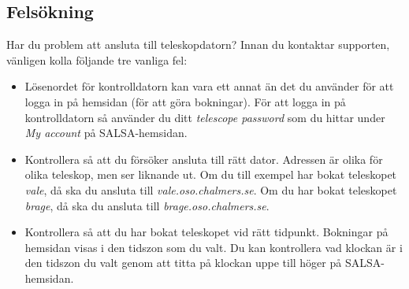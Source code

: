 \subsection{Felsökning}
Har du problem att ansluta till teleskopdatorn? Innan du kontaktar supporten,
vänligen kolla följande tre vanliga fel:
\begin{itemize} 
\item Lösenordet för kontrolldatorn kan vara ett annat än det du använder för 
	att logga in på hemsidan (för att göra bokningar). För att logga in på
	kontrolldatorn så använder du ditt \emph{telescope password} som du hittar
	under \emph{My account} på SALSA-hemsidan.
\item Kontrollera så att du försöker ansluta till rätt dator. Adressen är 
	olika för olika teleskop, men ser liknande ut. Om du till exempel
	har bokat teleskopet \emph{vale}, då ska du ansluta till 
	\emph{vale.oso.chalmers.se}. Om du har bokat teleskopet \emph{brage},
	då ska du ansluta till \emph{brage.oso.chalmers.se}. 
\item Kontrollera så att du har bokat teleskopet vid rätt tidpunkt. Bokningar
	på hemsidan visas i den tidszon som du valt. Du kan kontrollera vad klockan
	är i den tidszon du valt genom att titta på klockan uppe till höger på
	SALSA-hemsidan.  
	\end{itemize}

